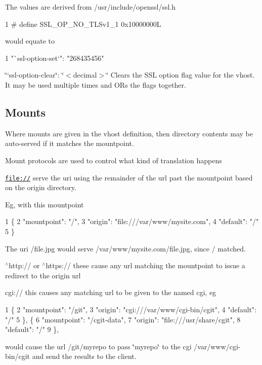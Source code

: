 The values are derived from /usr/include/openssl/ssl.h 
\begin{DoxyCode}
1 # define SSL\_OP\_NO\_TLSv1\_1                               0x10000000L
\end{DoxyCode}


would equate to


\begin{DoxyCode}
1 "`ssl-option-set`": "268435456"
\end{DoxyCode}

\begin{DoxyItemize}
\item \char`\"{}`ssl-\/option-\/clear\textquotesingle{}\char`\"{}\+: \char`\"{}$<$decimal$>$\char`\"{} Clears the S\+SL option flag value for the vhost. It may be used multiple times and OR\textquotesingle{}s the flags together.
\end{DoxyItemize}

\subsection*{Mounts }

Where mounts are given in the vhost definition, then directory contents may be auto-\/served if it matches the mountpoint.

Mount protocols are used to control what kind of translation happens


\begin{DoxyItemize}
\item \href{file://}{\tt file\+://} serve the uri using the remainder of the url past the mountpoint based on the origin directory.
\end{DoxyItemize}

Eg, with this mountpoint 
\begin{DoxyCode}
1 \{
2  "mountpoint": "/",
3  "origin": "file:///var/www/mysite.com",
4  "default": "/"
5 \}
\end{DoxyCode}
 The uri /file.jpg would serve /var/www/mysite.com/file.\+jpg, since / matched.


\begin{DoxyItemize}
\item $^\wedge$http\+:// or $^\wedge$https\+:// these cause any url matching the mountpoint to issue a redirect to the origin url
\item cgi\+:// this causes any matching url to be given to the named cgi, eg 
\begin{DoxyCode}
1 \{
2  "mountpoint": "/git",
3  "origin": "cgi:///var/www/cgi-bin/cgit",
4  "default": "/"
5 \}, \{
6  "mountpoint": "/cgit-data",
7  "origin": "file:///usr/share/cgit",
8  "default": "/"
9 \},
\end{DoxyCode}
 would cause the url /git/myrepo to pass \char`\"{}myrepo\char`\"{} to the cgi /var/www/cgi-\/bin/cgit and send the results to the client.
\end{DoxyItemize}

